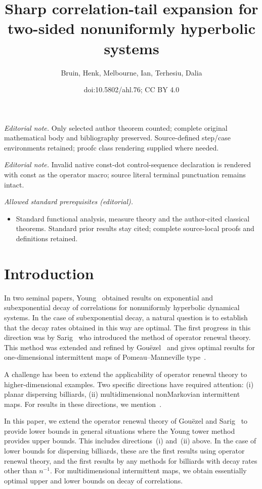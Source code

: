 \documentclass[10pt]{amsart}
\title{Sharp correlation-tail expansion for two-sided nonuniformly hyperbolic systems}
\author{Bruin, Henk, Melbourne, Ian, Terhesiu, Dalia}
\date{doi:10.5802/ahl.76; CC BY 4.0}
\theoremstyle{definition}\newtheorem{defi}[theo]{Definition}\newtheorem{rema}[theo]{Remark}\newtheorem{exam}[theo]{Example}\newtheorem{exem}[theo]{Example}\newtheorem{nota}[theo]{Notation}
\begin{document}
\maketitle
\noindent\textit{Editorial note.} Only selected author theorem counted; complete original mathematical body and bibliography preserved. Source-defined step/case environments retained; proofc class rendering supplied where needed.\par\medskip
\noindent\textit{Editorial note.} Invalid native const-dot control-sequence declaration is rendered with const as the operator macro; source literal terminal punctuation remains intact.\par\medskip
\noindent\textit{Allowed standard prerequisites (editorial).}\begin{itemize}
\item Standard functional analysis, measure theory and the author-cited classical theorems. Standard prior results stay cited; complete source-local proofs and definitions retained.
\end{itemize}\medskip


\section{Introduction}

In two seminal papers, Young~\cite{Young98,Young99} obtained results on exponential and subexponential decay of correlations for nonuniformly hyperbolic dynamical systems. In the case of subexponential decay, a natural question is to establish that the decay rates obtained in this way are optimal. The first progress in this direction was by Sarig~\cite{Sarig02} who introduced the method of operator renewal theory. This method was extended and refined by Gou\"ezel~\cite{Gouezel04a} and gives optimal results for one-dimensional intermittent maps of Pomeau--Manneville type~\cite{PomeauManneville80,Thaler80}.

A challenge has been to extend the applicability of operator renewal theory to higher-dimensional examples. Two specific directions have required attention: (i) planar dispersing billiards, (ii) multidimensional nonMarkovian intermittent maps. For results in these directions, we mention~\cite{HuVaientiapp,VaientiZhangsub}.

In this paper, we extend the operator renewal theory of Gou\"ezel and Sarig~\cite{Gouezel04a,Sarig02} to provide lower bounds in general situations where the Young tower method \cite{Young99} provides upper bounds. This includes directions~(i) and~(ii) above. In the case of lower bounds for dispersing billiards, these are the first results using operator renewal theory, and the first results by any methods for billiards with decay rates other than $n^{-1}$. For multidimensional intermittent maps, we obtain essentially optimal upper and lower bounds on decay of correlations.
\end{document}
